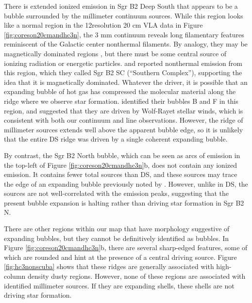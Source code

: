 \documentclass[twocolumn]{aastex61}
\begin{document}

There is extended ionized emission in Sgr B2 Deep South that appears to be a
bubble surrounded by the millimeter continuum sources.  While this region looks
like a normal \hii region in the 12\arcsec resolution 20 cm
VLA data in Figure \ref{fig:coreson20cmandhc3n}, the 3 mm continuum reveals long
filamentary features reminiscent of the Galactic center nonthermal filaments.  By
analogy, they may be magnetically dominated regions
\citep[e.g.,][]{LaRosa2004a}, but there must be some
central source of ionizing radiation or energetic particles.
\citet{Jones2011a} and \citet{Protheroe2008a} reported nonthermal
emission from this region, which they called Sgr B2 SC (``Southern Complex''),
supporting the idea that it is magnetically dominated. 
Whatever the
driver, it is possible that an expanding bubble of hot gas has compressed the
molecular material along the ridge where we observe star formation.
\citet{Martin-Pintado1999a} identified their bubbles B and F in this region,
and suggested that they are driven by Wolf-Rayet stellar winds, which is
consistent with both our continuum and line observations.  However, the ridge
of millimeter sources extends well above the apparent bubble edge, so it is
unlikely that the entire DS ridge was driven by a single coherent expanding
bubble.

By contrast, the Sgr B2 North bubble, which can be seen as arcs of
\cyanoacetylene emission in the top-left of Figure
\ref{fig:coreson20cmandhc3n}b, does not contain any ionized emission.  It
contains fewer total sources than DS, and these sources may trace the edge of
an expanding bubble previously noted by \citet{de-Vicente1997a}.  However,
unlike in DS, the sources are not well-correlated with the \cyanoacetylene
emission peaks, suggesting that the present bubble expansion is halting rather
than driving star formation in Sgr B2 N.

There are other regions within our map that have morphology suggestive of
expanding bubbles, but they cannot be definitively identified as bubbles.  In
Figure \ref{fig:coreson20cmandhc3n}b, there are several sharp-edged
\cyanoacetylene features, some of which are rounded and hint at the presence of
a central driving source. Figure \ref{fig:hc3nonscuba} shows that these ridges
are generally associated with high-column density dusty regions.  However, none
of these regions are associated with identified millimeter sources.  If they
are expanding shells, these shells are not driving star formation.
\end{document}
